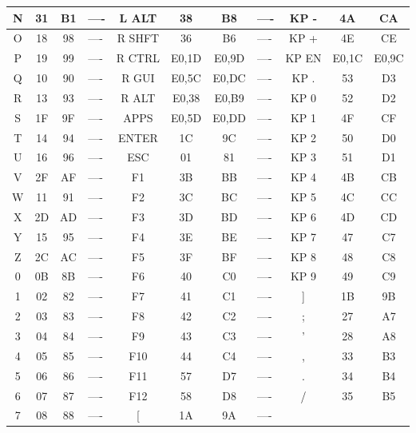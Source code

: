 \documentclass[12pt]{article}
\begin{document}
\begin{tabular}{|c|c|c|l|c|c|c|l|c|c|c|}
	 N  &  31  &  B1   &----&L ALT &   38   &   B8  &----&   KP -  &   4A  & CA    \\ \hline
	 O  &  18  &  98   &----&R SHFT&   36   &   B6  &----&   KP +  &   4E  & CE    \\ \hline
	 P  &  19  &  99   &----&R CTRL&  E0,1D & E0,9D &----&   KP EN & E0,1C & E0,9C \\ \hline
	 Q  &  10  &  90   &----&R GUI &  E0,5C & E0,DC &----&   KP .  &   53  & D3   \\ \hline
	 R  &  13  &  93   &----&R ALT &  E0,38 & E0,B9 &----&   KP 0  &   52  & D2   \\ \hline
	 S  &  1F  &  9F   &----& APPS &  E0,5D & E0,DD &----&   KP 1  &   4F  & CF   \\ \hline
	 T  &  14  &  94   &----& ENTER&   1C   &   9C  &----&   KP 2  &   50  & D0   \\ \hline
	 U  &  16  &  96   &----&  ESC &   01 	&   81  &----&   KP 3  &   51  & D1   \\ \hline
	 V  &  2F  &  AF   &----&  F1  &   3B 	&   BB  &----&   KP 4  &   4B  & CB   \\ \hline
	 W  &  11  &  91   &----&  F2  &   3C 	&   BC  &----&   KP 5  &   4C  & CC   \\ \hline
	 X  &  2D  &  AD   &----&  F3  &   3D 	&   BD  &----&   KP 6  &   4D  & CD   \\ \hline
	 Y  &  15  &  95   &----&  F4  &   3E 	&   BE  &----&   KP 7  &   47  & C7   \\ \hline
	 Z  &  2C  &  AC   &----&  F5  &   3F  	&   BF  &----&   KP 8  &   48  & C8   \\ \hline
	 0  &  0B  &  8B   &----&  F6  &   40  	&   C0  &----&   KP 9  &   49  & C9   \\ \hline
	 1  &  02  &  82   &----&  F7  &   41  	&   C1  &----&   ]     &   1B  & 9B   \\ \hline
	 2  &  03  &  83   &----&  F8  &   42  	&   C2  &----&   ;     &   27  & A7   \\ \hline
	 3  &  04  &  84   &----&  F9  &   43  	&   C3  &----&   '     &   28  & A8   \\ \hline     
	 4  &  05  &  85   &----&  F10 &   44  	&   C4  &----&   ,     &   33  & B3   \\ \hline   
	 5  &  06  &  86   &----&  F11 &   57   &   D7  &----&   .     &   34  & B4   \\ \hline
	 6  &  07  &  87   &----&  F12 &   58   &   D8  &----&   /     &   35  & B5   \\ \hline  
	 7  &  08  &  88   &----& 	[  &   1A   &   9A  &----&         &       &      \\
\hline
\end{tabular}
 
\end{document}
